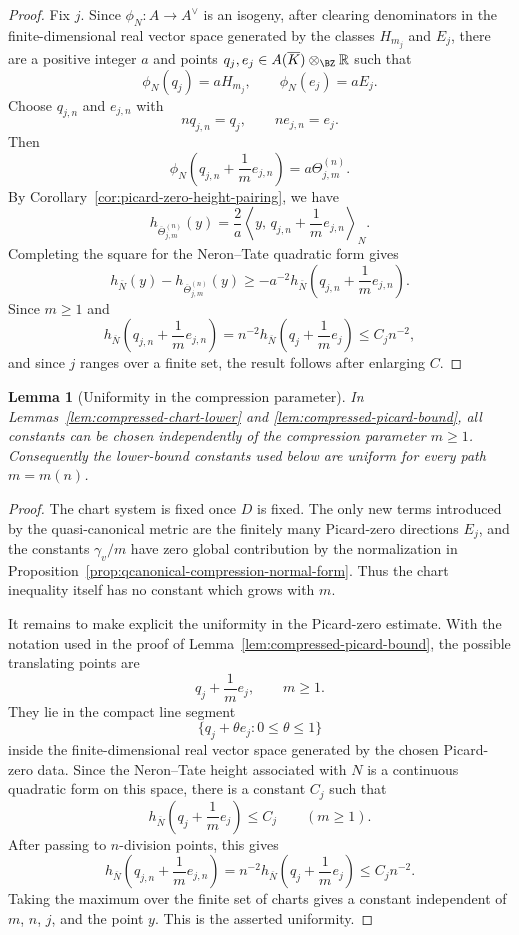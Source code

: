 \documentclass[10pt,a4paper]{amsart}
\theoremstyle{plain}
\newtheorem{lemma}[theorem]{Lemma}
\theoremstyle{plain}
\numberwithin{equation}{section}
\providecommand{\bR}{\mathbb{R}}
\begin{document}
\begin{proof}
	Fix \(j\).  Since \(\phi_N:A\to A^\vee\) is an isogeny, after clearing
	denominators in the finite-dimensional real vector space generated by the
	classes \(H_{m_j}\) and \(E_j\), there are a positive integer \(a\) and points
	\(q_j,e_j\in A(\overline K)\otimes_\BZ\bR\) such that
	\[
	\phi_N(q_j)=aH_{m_j},\qquad \phi_N(e_j)=aE_j.
	\]
	Choose \(q_{j,n}\) and \(e_{j,n}\) with
	\[
	nq_{j,n}=q_j,\qquad ne_{j,n}=e_j.
	\]
	Then
	\[
	\phi_N\left(q_{j,n}+\frac1m e_{j,n}\right)
	=
	a\Theta_{j,m}^{(n)}.
	\]
	By Corollary~\ref{cor:picard-zero-height-pairing}, we have
	\[
	h_{\overline\Theta_{j,m}^{(n)}}(y)
	=
	\frac2a
	\left\langle y,\,
	q_{j,n}+\frac1m e_{j,n}
	\right\rangle_N .
	\]
	Completing the square for the Neron--Tate quadratic form gives
	\[
	h_{\overline N}(y)-h_{\overline\Theta_{j,m}^{(n)}}(y)
	\ge
	-a^{-2}
	h_{\overline N}\left(q_{j,n}+\frac1m e_{j,n}\right).
	\]
	Since \(m\ge1\) and
	\[
	h_{\overline N}\left(q_{j,n}+\frac1m e_{j,n}\right)
	=
	n^{-2}h_{\overline N}\left(q_j+\frac1m e_j\right)
	\le C_jn^{-2},
	\]
	and since \(j\) ranges over a finite set, the result follows after enlarging
	\(C\).
\end{proof}

\begin{lemma}[Uniformity in the compression parameter]
	\label{lem:compressed-lower-uniformity}
	In Lemmas~\ref{lem:compressed-chart-lower} and
	\ref{lem:compressed-picard-bound}, all constants can be chosen independently of
	the compression parameter \(m\ge1\).  Consequently the lower-bound constants
	used below are uniform for every path \(m=m(n)\).
\end{lemma}

\begin{proof}
	The chart system is fixed once \(D\) is fixed.  The only new terms introduced by
	the quasi-canonical metric are the finitely many Picard-zero directions
	\(E_j\), and the constants \(\gamma_v/m\) have zero global contribution by the
	normalization in Proposition~\ref{prop:qcanonical-compression-normal-form}.  Thus
	the chart inequality itself has no constant which grows with \(m\).
	
	It remains to make explicit the uniformity in the Picard-zero estimate.  With
	the notation used in the proof of Lemma~\ref{lem:compressed-picard-bound}, the
	possible translating points are
	\[
	q_j+\frac1m e_j,\qquad m\ge1.
	\]
	They lie in the compact line segment
	\[
	\{q_j+\theta e_j:0\le\theta\le1\}
	\]
	inside the finite-dimensional real vector space generated by the chosen
	Picard-zero data.  Since the Neron--Tate height associated with \(N\) is a
	continuous quadratic form on this space, there is a constant \(C_j\) such that
	\[
	h_{\overline N}\left(q_j+\frac1m e_j\right)\le C_j
	\qquad(m\ge1).
	\]
	After passing to \(n\)-division points, this gives
	\[
	h_{\overline N}\left(q_{j,n}+\frac1m e_{j,n}\right)
	=n^{-2}h_{\overline N}\left(q_j+\frac1m e_j\right)
	\le C_jn^{-2}.
	\]
	Taking the maximum over the finite set of charts gives a constant independent
	of \(m\), \(n\), \(j\), and the point \(y\).  This is the asserted uniformity.
\end{proof}
\end{document}
